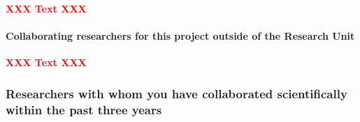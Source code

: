 \documentclass[10pt,fleqn,twoside]{article}
\newcommand{\missing}[1]{\textcolor{red}{\textbf{XXX #1 XXX}}}
\begin{document}
\missing{Text}

\paragraph{\Tcol Collaborating researchers for this project outside of
  the Research Unit}

\missing{Text}

\subsubsection{Researchers with whom you have collaborated scientifically within the past three years}
\end{document}
